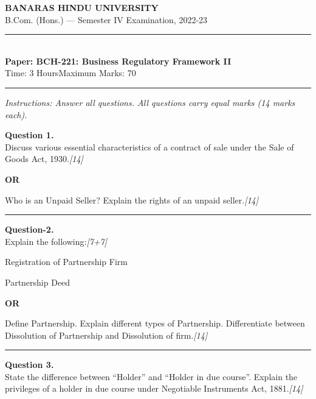 \documentclass[11pt,a4paper]{article}
\newcommand{\pts}[1]{\hfill   \textit{[#1]}}
\begin{document}
\begin{center}
  {\large\bfseries BANARAS HINDU UNIVERSITY}\\[2pt]
  {\normalsize B.Com. (Hons.) --- Semester IV Examination, 2022-23}\\[6pt]
  \rule{0.8\linewidth}{0.5pt}\\[6pt]
  {\large\bfseries Paper: BCH-221: Business Regulatory Framework II}\\[4pt]
  {\normalsize Time: 3 Hours\hfill Maximum Marks: 70}
\end{center}

\rule{\linewidth}{0.4pt}

\smallskip



\noindent   \textit{Instructions: Answer all questions. All questions carry equal marks (14 marks each).}

\bigskip




\noindent   \textbf{Question 1.} \\
Discuss various essential characteristics of a contract of sale under the Sale of Goods Act, 1930.\pts{14}

\centerline{   \textbf{OR}}

Who is an Unpaid Seller? Explain the rights of an unpaid seller.\pts{14}

\medskip\rule{\linewidth}{0.2pt}




\noindent   \textbf{Question-2.} \\
Explain the following:\pts{7+7}

\begin{parts}
  \item Registration of Partnership Firm
  \item Partnership Deed
\end{parts}

\centerline{   \textbf{OR}}

Define Partnership. Explain different types of Partnership. Differentiate between Dissolution of Partnership and Dissolution of firm.\pts{14}

\medskip\rule{\linewidth}{0.2pt}




\noindent   \textbf{Question 3.} \\
State the difference between ``Holder'' and ``Holder in due course''. Explain the privileges of a holder in due course under Negotiable Instruments Act, 1881.\pts{14}
\end{document}
